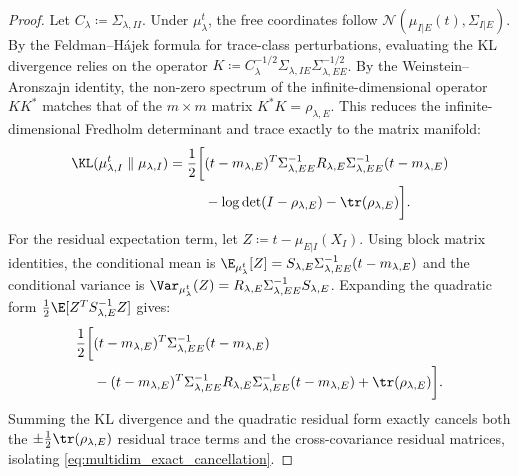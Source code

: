\begin{proof}
  Let $C_\lambda \coloneqq \Sigma_{\lambda,II}$. Under $\mu_\lambda^t$, the free coordinates follow $\mathcal{N}(\mu_{I|E}(t), \Sigma_{I|E})$. By the Feldman--H\'{a}jek formula for trace-class perturbations, evaluating the KL divergence relies on the operator $K \coloneqq C_\lambda^{-1/2} \Sigma_{\lambda,IE} \Sigma_{\lambda,EE}^{-1/2}$. By the Weinstein--Aronszajn identity, the non-zero spectrum of the infinite-dimensional operator $KK^*$ matches that of the $m \times m$ matrix $K^*K = \rho_{\lambda,E}$. This reduces the infinite-dimensional Fredholm determinant and trace exactly to the matrix manifold:
  \begin{equation*}
    \begin{aligned}
      \KL(\mu_{\lambda,I}^t \parallel \mu_{\lambda,I}) = \frac{1}{2} \bigg[ &(t - m_{\lambda,E})^T \Sigma_{\lambda,EE}^{-1} R_{\lambda,E} \Sigma_{\lambda,EE}^{-1} (t - m_{\lambda,E}) \\
      &- \log\det(I - \rho_{\lambda,E}) - \tr(\rho_{\lambda,E}) \bigg].
    \end{aligned}
  \end{equation*}
  For the residual expectation term, let $Z \coloneqq t - \mu_{E|I}(X_I)$. Using block matrix identities, the conditional mean is $\E_{\mu_\lambda^t}[Z] = S_{\lambda,E} \Sigma_{\lambda,EE}^{-1} (t - m_{\lambda,E})$ and the conditional variance is $\Var_{\mu_\lambda^t}(Z) = R_{\lambda,E} \Sigma_{\lambda,EE}^{-1} S_{\lambda,E}$. Expanding the quadratic form $\frac{1}{2}\E[Z^T S_{\lambda,E}^{-1} Z]$ gives:
  \begin{equation*}
    \begin{aligned}
      \frac{1}{2} \bigg[ &(t - m_{\lambda,E})^T \Sigma_{\lambda,EE}^{-1} (t - m_{\lambda,E}) \\
      &- (t - m_{\lambda,E})^T \Sigma_{\lambda,EE}^{-1} R_{\lambda,E} \Sigma_{\lambda,EE}^{-1} (t - m_{\lambda,E}) + \tr(\rho_{\lambda,E}) \bigg].
    \end{aligned}
  \end{equation*}
  Summing the KL divergence and the quadratic residual form exactly cancels both the $\pm \frac{1}{2}\tr(\rho_{\lambda,E})$ residual trace terms and the cross-covariance residual matrices, isolating \eqref{eq:multidim_exact_cancellation}.
\end{proof}

